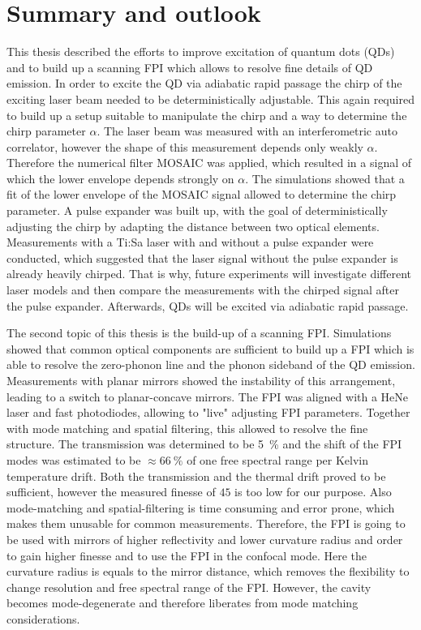 \chapter{Summary and outlook}

This thesis described the efforts to improve excitation of quantum dots (\ac{QD}s) and to build up a scanning \acl{FPI} which allows to resolve fine details of \ac{QD} emission.
In order to excite the \ac{QD} via adiabatic rapid passage the chirp of the exciting laser beam needed to be deterministically adjustable.
This again required to build up a setup suitable to manipulate the chirp and a way to determine the chirp parameter $\alpha$.
The laser beam was measured with an interferometric auto correlator, however the shape of this measurement depends only weakly $\alpha$.
Therefore the numerical filter \ac{MOSAIC} was applied, which resulted in a signal of which the lower envelope depends strongly on $\alpha$.
The simulations showed that a fit of the lower envelope of the \ac{MOSAIC} signal allowed to determine the chirp parameter.
A pulse expander was built up, with the goal of deterministically adjusting the chirp by adapting the distance between two optical elements.
Measurements with a Ti:Sa laser with and without a pulse expander were conducted, which suggested that the laser signal without the pulse expander is already heavily chirped.
That is why, future experiments will investigate different laser models and then compare the measurements with the chirped signal after the pulse expander.
Afterwards, \acp{QD} will be excited via adiabatic rapid passage.

The second topic of this thesis is the build-up of a scanning \ac{FPI}.
Simulations showed that common optical components are sufficient to build up a \ac{FPI} which is able to resolve the zero-phonon line and the phonon sideband of the \ac{QD} emission.
Measurements with planar mirrors showed the instability of this arrangement, leading to a switch to planar-concave mirrors.
The \ac{FPI} was aligned with a HeNe laser and fast photodiodes, allowing to "live" adjusting \ac{FPI} parameters.
Together with mode matching and spatial filtering, this allowed to resolve the fine structure.
The transmission was determined to be \SI{5}{\percent} and the shift of the \ac{FPI} modes was estimated to be $\approx \SI{66}{\percent}$ of one free spectral range per Kelvin temperature drift.
Both the transmission and the thermal drift proved to be sufficient, however the measured finesse of $45$ is too low for our purpose.
Also mode-matching and spatial-filtering is time consuming and error prone, which makes them unusable for common measurements.
Therefore, the \ac{FPI} is going to be used with mirrors of higher reflectivity and lower curvature radius and order to gain higher finesse and to use the \ac{FPI} in the confocal mode.
Here the curvature radius is equals to the mirror distance, which removes the flexibility to change resolution and free spectral range of the \ac{FPI}.
However, the cavity becomes mode-degenerate and therefore liberates from mode matching considerations.